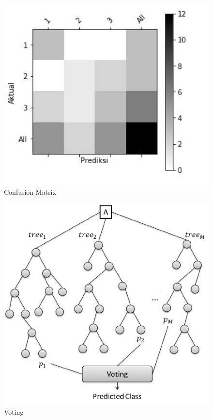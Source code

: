 \begin{figure}
	\centerline{\includegraphics[width=1\textwidth]{figures/huda/chapter3/3.JPG}}
	\caption{Confusion Matrix}
	\label{h3}
\end{figure}

\begin{figure}
	\centerline{\includegraphics[width=1\textwidth]{figures/huda/chapter3/4.png}}
	\caption{Voting}
	\label{h4}
\end{figure}

